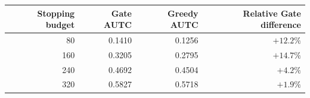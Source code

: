 \begin{tabular}{@{}rrrr@{}}
\toprule
Stopping budget & Gate AUTC & Greedy AUTC & Relative Gate difference \\
\midrule
80  & 0.1410 & 0.1256 & $+12.2\%$ \\
160 & 0.3205 & 0.2795 & $+14.7\%$ \\
240 & 0.4692 & 0.4504 & $+4.2\%$ \\
320 & 0.5827 & 0.5718 & $+1.9\%$ \\
\bottomrule
\end{tabular}
